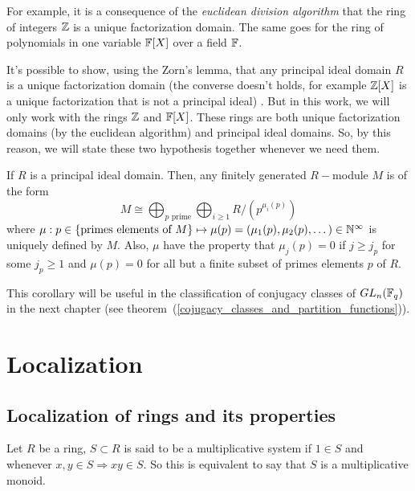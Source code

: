 \begin{dang}
    \begin{example}
        For example, it is a consequence of the \textit{euclidean division algorithm} that the ring of integers $\mathbb{Z}$ is a unique factorization domain. The same goes for the ring of polynomials in one variable $\mathbb{F}[X]$ over a field $\mathbb{F}$.
    \end{example}
\end{dang}
It's possible to show, using the Zorn's lemma, that any principal ideal domain $R$ is a unique factorization domain (the converse doesn't holds, for example $\mathbb{Z}[X]$ is a unique factorization that is not a principal ideal) \cite{hungerford2012algebra}. But in this work, we will only work with the rings $\mathbb{Z}$ and $\mathbb{F}[X]$. These rings are both unique factorization domains (by the euclidean algorithm) and principal ideal domains. So, by this reason, we will state these two hypothesis together whenever we need them.
\begin{dang}
    \begin{corollary}\label{refinement_of_structure_theorem}\cite{curtis1966representation}
        If $R$ is a principal ideal domain. Then, any finitely generated $R-$module $M$ is of the form
        \begin{equation}
            M\cong \bigoplus_{p\text{ prime}}\bigoplus_{i\geq1}R/(p^{\mu_i(p)})
        \end{equation}
        where $\mu: p\in\{\text{primes elements of }M\}\mapsto \mu(p)=(\mu_1(p),\mu_2(p),\dots)\in\mathbb{N}^\infty$ is uniquely defined by $M$. Also, $\mu$ have the property that $\mu_j(p)=0$ if $j\geq j_p$ for some $j_p\geq1$ and $\mu(p)=0$ for all but a finite subset of primes elements $p$ of $R$.
    \end{corollary}
\end{dang}
This corollary will be useful in the classification of conjugacy classes of $GL_n(\mathbb{F}_q)$ in the next chapter (see theorem~(\ref{cojugacy_classes_and_partition_functions})). 
\section{Localization}

\subsection{Localization of rings and its properties}
\begin{dang}
    \begin{definition}
    Let $R$ be a ring, $S\subset R$ is said to be a multiplicative system if $1\in S$ and whenever $x,y\in S\Rightarrow xy \in S$. So this is equivalent to say that $S$ is a multiplicative monoid.
    \end{definition}
\end{dang}


